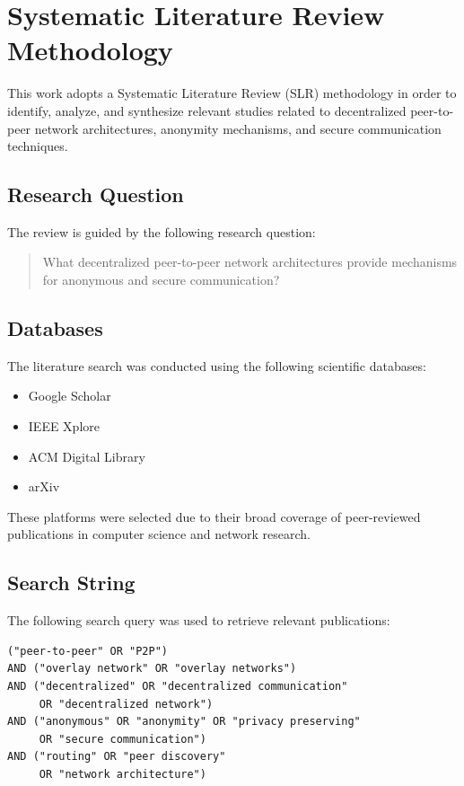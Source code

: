\documentclass[12pt]{article}
\begin{document}
\section{Systematic Literature Review Methodology}

This work adopts a Systematic Literature Review (SLR) methodology in order to identify, analyze, and synthesize relevant studies related to decentralized peer-to-peer network architectures, anonymity mechanisms, and secure communication techniques.

\subsection{Research Question}

The review is guided by the following research question:

\begin{quote}
What decentralized peer-to-peer network architectures provide mechanisms for anonymous and secure communication?
\end{quote}

\subsection{Databases}

The literature search was conducted using the following scientific databases:

\begin{itemize}
    \item Google Scholar
    \item IEEE Xplore
    \item ACM Digital Library
    \item arXiv
\end{itemize}

These platforms were selected due to their broad coverage of peer-reviewed publications in computer science and network research.

\subsection{Search String}

The following search query was used to retrieve relevant publications:

\begin{verbatim}
("peer-to-peer" OR "P2P") 
AND ("overlay network" OR "overlay networks") 
AND ("decentralized" OR "decentralized communication"
     OR "decentralized network") 
AND ("anonymous" OR "anonymity" OR "privacy preserving"
     OR "secure communication") 
AND ("routing" OR "peer discovery"
     OR "network architecture")
\end{verbatim}
\end{document}
